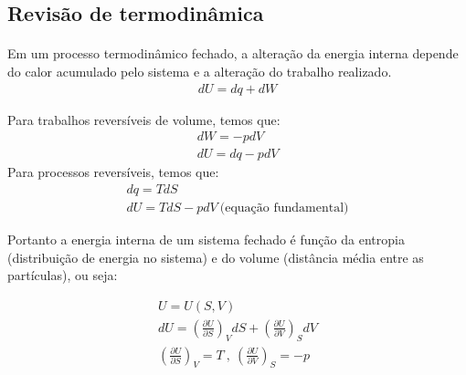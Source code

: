 
\begin{multicols*}{2}

  \section*{Revisão de termodinâmica}

  \paragraph{ }

  \begin{definition}
    Em um processo termodinâmico fechado, a alteração da energia interna depende do calor acumulado pelo sistema e a alteração do trabalho realizado.
    \begin{gather}
      dU = dq + dW
    \end{gather}
  \end{definition}

  \begin{corollary}
    Para trabalhos reversíveis de volume, temos que:
    \begin{gather}
      dW = -p dV \\
      dU = dq - p dV
    \end{gather}
    Para processos reversíveis, temos que:
    \begin{gather}
      dq = TdS \\
      dU = TdS - pdV \ \text{(equação fundamental)}
    \end{gather}
  \end{corollary}
  
  Portanto a energia interna de um sistema fechado é função da entropia (distribuição de energia no sistema) e do volume (distância média entre as partículas), ou seja:
  \begin{theorem}
    \begin{gather}
      U = U(S,V) \\
      dU = \left( \frac{\partial U}{\partial S} \right)_V dS + \left( \frac{\partial U}{\partial V}  \right)_S dV \\
      \left( \frac{\partial U}{\partial S}  \right)_V = T \ , \ \left( \frac{\partial U}{\partial V}  \right)_S = -p
    \end{gather}  
  \end{theorem}


\end{multicols*}
